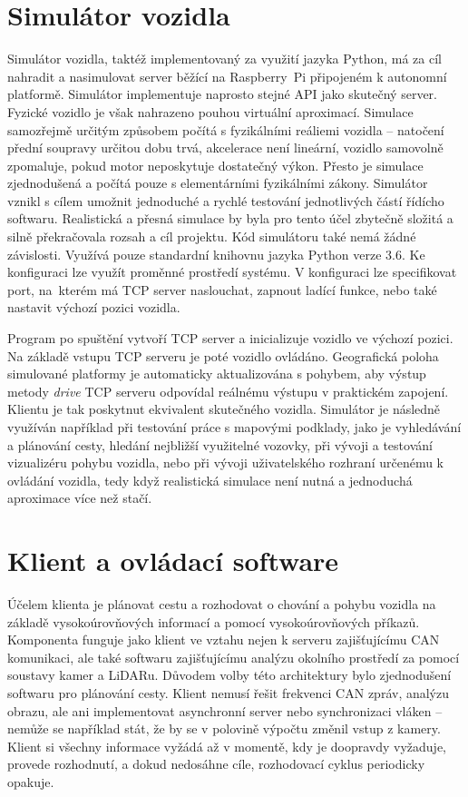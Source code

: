 \documentclass[czech, bachelor]{diploma}
\begin{document}
\chapter{Simulátor vozidla}

Simulátor vozidla, taktéž implementovaný za využití jazyka Python, má za cíl nahradit a nasimulovat server běžící na Raspberry~Pi
připojeném k autonomní platformě. Simulátor implementuje naprosto stejné API jako skutečný server. Fyzické vozidlo je však
nahrazeno pouhou virtuální aproximací. Simulace samozřejmě určitým způsobem počítá s fyzikálními reáliemi vozidla -- natočení
přední soupravy určitou dobu trvá, akcelerace není lineární, vozidlo samovolně zpomaluje, pokud motor neposkytuje dostatečný
výkon. Přesto je simulace zjednodušená a počítá pouze s elementárními fyzikálními zákony. Simulátor vznikl s cílem umožnit
jednoduché a rychlé testování jednotlivých částí řídícho softwaru. Realistická a přesná simulace by byla pro tento účel zbytečně
složitá a silně překračovala rozsah a cíl projektu. Kód simulátoru také nemá žádné závislosti. Využívá pouze standardní knihovnu
jazyka Python verze 3.6. Ke konfiguraci lze využít proměnné prostředí systému. V konfiguraci lze specifikovat port, na~kterém má
TCP server naslouchat, zapnout ladící funkce, nebo také nastavit výchozí pozici vozidla.

Program po spuštění vytvoří TCP server a inicializuje vozidlo ve výchozí pozici. Na základě vstupu TCP serveru je poté vozidlo
ovládáno. Geografická poloha simulované platformy je automaticky aktualizována s pohybem, aby výstup metody \emph{drive} TCP
serveru odpovídal reálnému výstupu v praktickém zapojení. Klientu je tak poskytnut ekvivalent skutečného vozidla. Simulátor je
následně využíván například při testování práce s mapovými podklady, jako je vyhledávání a plánování cesty, hledání nejbližší
využitelné vozovky, při vývoji a testování vizualizéru pohybu vozidla, nebo při vývoji uživatelského rozhraní určenému k ovládání
vozidla, tedy když realistická simulace není nutná a jednoduchá aproximace více než stačí.

\chapter{Klient a ovládací software}

Účelem klienta je plánovat cestu a rozhodovat o chování a pohybu vozidla na základě vysokoúrovňových informací a pomocí
vysokoúrovňových příkazů. Komponenta funguje jako klient ve vztahu nejen k serveru zajišťujícímu CAN komunikaci, ale také
softwaru zajišťujícímu analýzu okolního prostředí za pomocí soustavy kamer a LiDARu. Důvodem volby této architektury bylo
zjednodušení softwaru pro plánování cesty. Klient nemusí řešit frekvenci CAN zpráv, analýzu obrazu, ale ani implementovat
asynchronní server nebo synchronizaci vláken -- nemůže se například stát, že by se v polovině výpočtu změnil vstup z kamery.
Klient si všechny informace vyžádá až v momentě, kdy je doopravdy vyžaduje, provede rozhodnutí, a dokud nedosáhne cíle,
rozhodovací cyklus periodicky opakuje.
\end{document}
